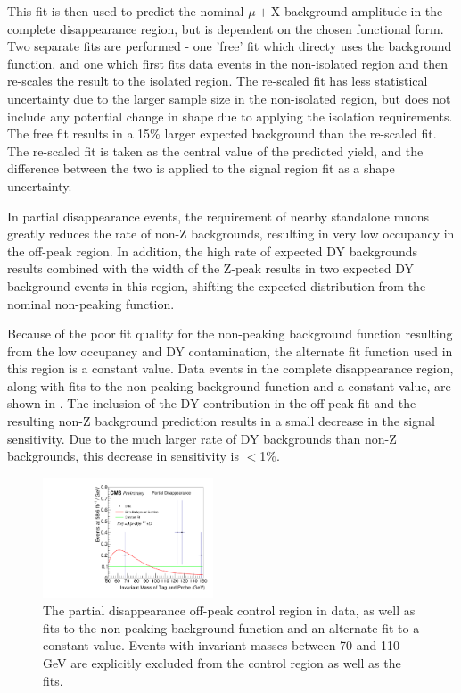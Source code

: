 This fit is then used to predict the nominal $\mu+$X background amplitude in the complete disappearance region, but is dependent on the chosen functional form. 
Two separate fits are performed - one 'free' fit which directy uses the background function, and one which first fits data events in the non-isolated region and then re-scales the result to the isolated region. 
The re-scaled fit has less statistical uncertainty due to the larger sample size in the non-isolated region, but does not include any potential change in shape due to applying the isolation requirements. 
The free fit results in a 15$\%$ larger expected background than the re-scaled fit. 
The re-scaled fit is taken as the central value of the predicted yield, and the difference between the two is applied to the signal region fit as a shape uncertainty.

In partial disappearance events, the requirement of nearby standalone muons greatly reduces the rate of non-Z backgrounds, resulting in very low occupancy in the off-peak region. 
In addition, the high rate of expected DY backgrounds results combined with the width of the Z-peak results in two expected DY background events in this region, shifting the expected distribution from the nominal non-peaking function.

Because of the poor fit quality for the non-peaking background function resulting from the low occupancy and DY contamination, the alternate fit function used in this region is a constant value.
Data events in the complete disappearance region, along with fits to the non-peaking background function and a constant value, are shown in .
The inclusion of the DY contribution in the off-peak fit and the resulting non-Z background prediction results in a small decrease in the signal sensitivity.
Due to the much larger rate of DY backgrounds than non-Z backgrounds, this decrease in sensitivity is $<$1$\%$.

\begin{figure}[htp]
    \centering
    \includegraphics[width=0.45\textwidth]{figures/offPeakFitPartialDisappearance.pdf}
     \caption[$\mu$+X background fits in the off-peak control region for partial disappearance events]{The partial disappearance off-peak control region in data, as well as fits to the non-peaking background function and an alternate fit to a constant value. Events with invariant masses between 70 and 110 GeV are explicitly excluded from the control region as well as the fits.}
    \label{fig:offPeakPartialDis}
 \end{figure}

